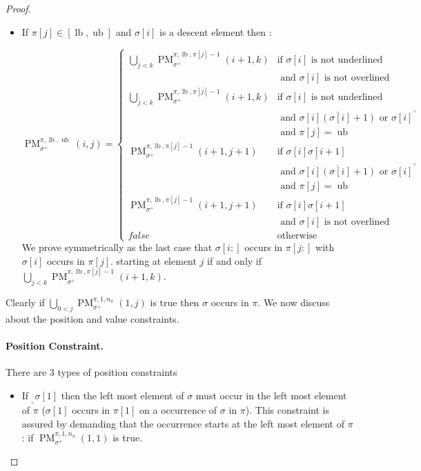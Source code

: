 \documentclass[a4paper]{llncs}
\newcommand{\ptext}{\pi}
\newcommand{\pmotif}{\sigma}
\newcommand{\pbmotif}{\pmotif^+}
\DeclareMathOperator{\PMa}{PM}
\newcommand{\PM}[6]{\PMa_{{#1}}^{{#2},{#3},{#4}}({#5},{#6})}
\DeclareMathOperator{\lb}{lb}
\DeclareMathOperator{\ub}{ub}
\begin{document}
\begin{proof}
\begin{itemize}
	\item If $\ptext[j] \in [\lb,\ub]$ and $\pmotif[i]$ is a descent element then :

	$$
	\PM{\pbmotif}{\ptext}{\lb}{\ub}{i}{j}=
	\begin{cases}
			\bigcup_{j<k} \PM{\pbmotif}{\ptext}{\lb}{\ptext[j]-1}{i+1}{k}
				& \text{if $\pmotif[i]$ is not underlined } \\
				& \text{ and $\pmotif[i]$ is not overlined} \\
			\bigcup_{j<k} \PM{\pbmotif}{\ptext}{\lb}{\ptext[j]-1}{i+1}{k}
				& \text{if $\pmotif[i]$ is not underlined } \\
				& \text{ and $\overline{\pmotif[i](\pmotif[i]+1)}$ or ${\pmotif[i]}^\urcorner$}\\
				& \text{ and $\ptext[j]=\ub$} \\
			\PM{\pbmotif}{\ptext}{\lb}{\ptext[j]-1}{i+1}{j+1}
				& \text{if $\underline{\pmotif[i]\pmotif[i+1]}$ } \\
				& \text{ and $\overline{\pmotif[i](\pmotif[i]+1)}$ or ${\pmotif[i]}^\urcorner$}\\
				& \text{ and $\ptext[j]=\ub$} \\
			\PM{\pbmotif}{\ptext}{\lb}{\ptext[j]-1}{i+1}{j+1}
				& \text{if $\underline{\pmotif[i]\pmotif[i+1]}$ } \\
				& \text{ and $\pmotif[i]$ is not overlined} \\
			false & \text{otherwise}
	\end{cases}
	$$	
	We prove symmetrically as the last case that 
	$\pmotif[i:]$ occurs in $\ptext[j:]$
	with $\sigma[i]$ occurs in $\pi[j]$.
	 starting at element $j$ if and only if $\bigcup_{j<k} \PM{\pbmotif}{\ptext}{\lb}{\ptext[j]-1}{i+1}{k}$. 

\end{itemize}

Clearly if $\bigcup_{0<j} \PM{\pbmotif}{\ptext}{1}{n_\ptext}{1}{j}$ is true then $\sigma$ occurs in $\pi$. We now discuss about the position and value constraints.
\paragraph{Position Constraint.} There are 3 types of position constraints 
\begin{itemize}
	\item If $_\llcorner{\sigma[1]}$ then the left most element of $\sigma$  must occur in the left most element of $\pi$ ($\pmotif[1]$ occurs in $\ptext[1]$ on a occurrence of $\pmotif$ in $\ptext$). This constraint is assured by demanding that the occurrence starts at the left most element of $\ptext$ : if  $\PM{\pbmotif}{\ptext}{1}{n_\ptext}{1}{1}$ is true.
	

\end{itemize}
\end{proof}
\end{document}
